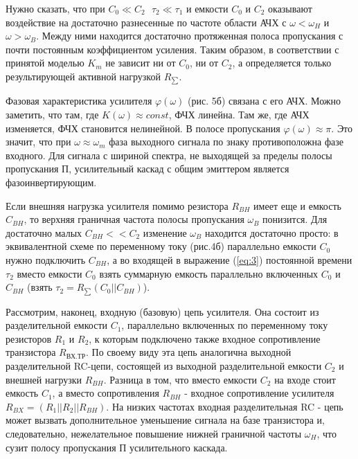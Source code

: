Нужно сказать, что при $C_0\ll C_2~~~\tau_2 \ll \tau_1$ и емкости $C_0$ и $C_2$ оказывают воздействие на достаточно разнесенные по частоте области АЧХ с $\omega<\omega_H$ и $\omega>\omega_B$. Между ними находится достаточно протяженная полоса пропускания с почти постоянным коэффициентом усиления. Таким образом, в соответствии с принятой моделью $K_m$ не зависит ни от $C_0$, ни от $C_2$, а определяется только результирующей активной нагрузкой $R_{\sum}$. 

Фазовая характеристика усилителя $\varphi(\omega)$ (рис. 5б) связана с его АЧХ. Можно заметить, что там, где $K(\omega) \approx const$, ФЧХ линейна. Там же, где АЧХ изменяется, ФЧХ становится нелинейной. В полосе пропускания $\varphi(\omega) \approx \pi$. Это значит, что при $\omega \approx \omega_m$ фаза выходного сигнала по знаку противоположна фазе входного. Для сигнала с шириной спектра, не выходящей за пределы полосы пропускания П, усилительный каскад с общим эмиттером является фазоинвертирующим.

Если внешняя нагрузка усилителя помимо резистора $R_{BH}$ имеет еще и емкость $C_{BH}$, то верхняя граничная частота полосы пропускания $\omega_B$ понизится. Для достаточно малых $C_{BH}<<C_2$ изменение $\omega_B$ находится достаточно просто: в эквивалентной схеме по переменному току (рис.4б) параллельно емкости $C_0$ нужно подключить $C_{BH}$, а во входящей в выражение (\ref{eq:3}) постоянной времени $\tau_2$ вместо емкости $C_0$ взять суммарную емкость параллельно включенных $C_0$ и $C_{BH}$ (взять $\tau_2 = R_{\sum}(C_0||C_{BH})$).

Рассмотрим, наконец, входную (базовую) цепь усилителя. Она состоит из разделительной емкости $C_1$, параллельно включенных по переменному току резисторов $R_1$ и $R_2$, к которым подключено также входное сопротивление транзистора $R_{\text{ВХ.ТР}}$. По своему виду эта цепь аналогична выходной разделительной RC-цепи, состоящей из выходной разделительной емкости $C_2$ и внешней нагрузки $R_{BH}$. Разница в том, что вместо емкости $C_2$ на входе стоит емкость $C_1$, а вместо сопротивления $R_{BH}$ - входное сопротивление усилителя $R_{BX}= (R_1||R_2||R_{BH})$. На низких частотах входная разделительная RC - цепь может вызвать дополнительное уменьшение сигнала на базе транзистора и, следовательно, нежелательное повышение нижней граничной частоты $\omega_H$, что сузит полосу пропускания П усилительного каскада.

